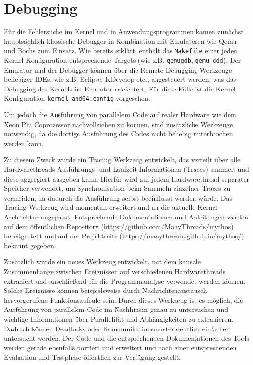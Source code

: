 \section{Debugging}
Für die Fehlersuche im Kernel und in Anwendungsprogrammen kamen zunächst
hauptsächlich klassische Debugger in Kombination mit Emulatoren wie Qemu und
Bochs zum Einsatz. Wie bereits erklärt, enthält das \texttt{Makefile} einer
jeden Kernel-Konfiguration entsprechende Targets (wie z.B. \texttt{qemugdb},
\texttt{qemu-ddd}). Der Emulator und der Debugger können über
die Remote-Debugging Werkzeuge beliebiger IDEs, wie z.B. Eclipse, KDevelop
etc., angesteuert werden, was das Debugging des Kernels im Emulator erleichtert.
Für diese Fälle ist die Kernel-Konfiguration \texttt{kernel-amd64.config}
vorgesehen.

Um jedoch die Ausführung von parallelem Code auf realer Hardware wie dem Xeon
Phi Coprozessor nachvollziehen zu können, sind zusätzliche Werkzeuge notwendig,
da die dortige Ausführung des Codes nicht beliebig unterbrochen werden kann.

Zu diesem Zweck wurde ein Tracing Werkzeug entwickelt, das verteilt über alle
Hardwarethreads Ausführungs- und Laufzeit-Informationen (Traces) sammelt und
diese aggregiert ausgeben kann.
Hierfür wird auf jedem Hardwarethread separater Speicher verwendet, um
Synchronisation beim Sammeln einzelner Traces zu vermeiden, da dadurch die
Ausführung selbst beeinflusst werden würde.  Das Tracing Werkzeug wird momentan erweitert
und an die aktuelle Kernel-Architektur angepasst. Entsprechende Dokumentationen
und Anleitungen werden auf dem öffentlichen Repository
(\url{https://github.com/ManyThreads/mythos}) bereitgestellt und auf der
Projektseite (\url{https://manythreads.github.io/mythos/}) bekannt gegeben.

Zusätzlich wurde ein neues Werkzeug entwickelt, mit dem kausale Zusammenhänge
zwischen Ereignissen auf verschiedenen Hardwarethreads extrahiert und
anschließend für die Programmanalyse verwendet werden können. Solche Ereignisse
können beispielsweise durch Nachrichtenaustausch hervorgerufene Funktionsaufrufe
sein. Durch dieses Werkzeug ist es möglich, die Ausführung von parallelem Code
im Nachhinein genau zu untersuchen und wichtige Informationen über Parallelität
und Abhängigkeiten zu extrahieren. Dadurch können Deadlocks oder
Kommunikationsmuster deutlich einfacher untersucht werden. Der Code und die
entsprechenden Dokumentationen des Tools werden gerade ebenfalls portiert und
erweitert und nach einer entsprechenden Evaluation und Testphase öffentlich zur
Verfügung gestellt.

% 
% 


